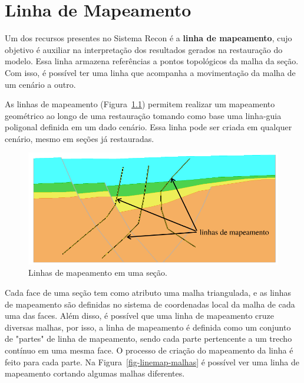 
\chapter{Linha de Mapeamento}

Um dos recursos presentes no Sistema Recon é a \textbf{linha de mapeamento}, cujo objetivo é auxiliar na interpretação dos resultados gerados na restauração do modelo. Essa linha armazena referências a pontos topológicos da malha da seção. Com isso, é possível ter uma linha que acompanha a movimentação da malha de um cenário a outro.

As linhas de mapeamento (Figura~\ref{fig-linemap}) permitem realizar um mapeamento geométrico ao longo de uma restauração tomando como base uma linha-guia poligonal definida em um dado cenário. Essa linha pode ser criada em qualquer cenário, mesmo em seções já restauradas.

\begin{figure} [h]
  \begin{center}
    \includegraphics[width=400pt]{images/fig-linhas-de-mapeamento-ed}
    \caption{Linhas de mapeamento em uma seção.}\label{fig-linemap}
  \end{center}
\end{figure}

Cada face de uma seção tem como atributo uma malha triangulada, e as linhas de mapeamento são definidas no sistema de coordenadas local da malha de cada uma das faces. Além disso, é possível que uma linha de mapeamento cruze diversas malhas, por isso, a linha de mapeamento é definida como um conjunto de "partes" de linha de mapeamento, sendo cada parte pertencente a um trecho contínuo em uma mesma face. O processo de criação do mapeamento da linha é feito para cada parte. Na Figura~\ref{fig-linemap-malhas} é possível ver uma linha de mapeamento cortando algumas malhas diferentes.

